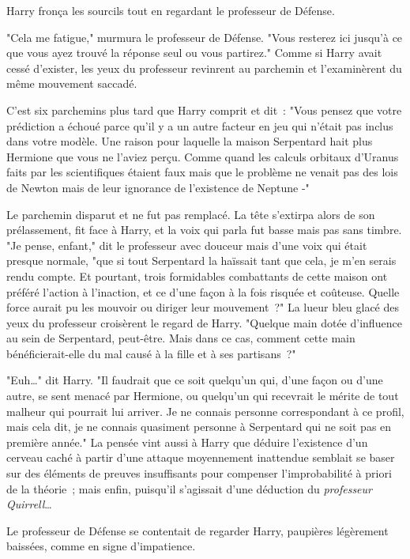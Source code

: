 Harry fronça les sourcils tout en regardant le professeur de Défense.

"Cela me fatigue," murmura le professeur de Défense. "Vous resterez ici jusqu'à ce que vous ayez trouvé la réponse seul ou vous partirez." Comme si Harry avait cessé d'exister, les yeux du professeur revinrent au parchemin et l'examinèrent du même mouvement saccadé.

C'est six parchemins plus tard que Harry comprit et dit~: "Vous pensez que votre prédiction a échoué parce qu'il y a un autre facteur en jeu qui n'était pas inclus dans votre modèle. Une raison pour laquelle la maison Serpentard hait plus Hermione que vous ne l'aviez perçu. Comme quand les calculs orbitaux d'Uranus faits par les scientifiques étaient faux mais que le problème ne venait pas des lois de Newton mais de leur ignorance de l'existence de Neptune -"

Le parchemin disparut et ne fut pas remplacé. La tête s'extirpa alors de son prélassement, fit face à Harry, et la voix qui parla fut basse mais pas sans timbre. "Je pense, enfant," dit le professeur avec douceur mais d'une voix qui était presque normale, "que si tout Serpentard la haïssait tant que cela, je m'en serais rendu compte. Et pourtant, trois formidables combattants de cette maison ont préféré l'action à l'inaction, et ce d'une façon à la fois risquée et coûteuse. Quelle force aurait pu les mouvoir ou diriger leur mouvement~?" La lueur bleu glacé des yeux du professeur croisèrent le regard de Harry. "Quelque main dotée d'influence au sein de Serpentard, peut-être. Mais dans ce cas, comment cette main bénéficierait-elle du mal causé à la fille et à ses partisans~?"

"Euh…" dit Harry. "Il faudrait que ce soit quelqu'un qui, d'une façon ou d'une autre, se sent menacé par Hermione, ou quelqu'un qui recevrait le mérite de tout malheur qui pourrait lui arriver. Je ne connais personne correspondant à ce profil, mais cela dit, je ne connais quasiment personne à Serpentard qui ne soit pas en première année." La pensée vint aussi à Harry que déduire l'existence d'un cerveau caché à partir d'une attaque moyennement inattendue semblait se baser sur des éléments de preuves insuffisants pour compenser l'improbabilité à priori de la théorie~; mais enfin, puisqu'il s'agissait d'une déduction du \emph{professeur Quirrell}…

Le professeur de Défense se contentait de regarder Harry, paupières légèrement baissées, comme en signe d'impatience.

